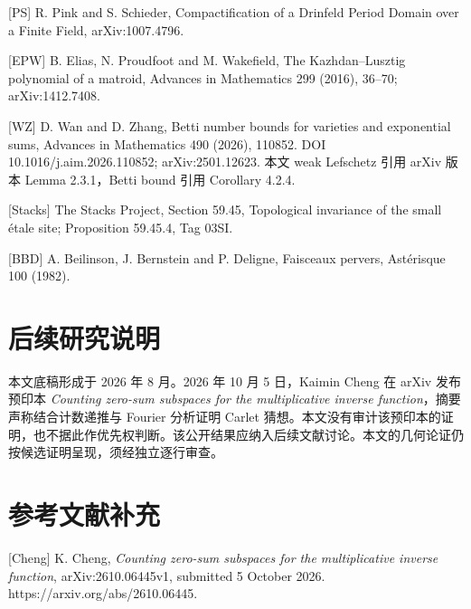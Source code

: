 \documentclass[11pt]{ctexart}
\begin{document}
[PS] R. Pink and S. Schieder, Compactification of a Drinfeld Period Domain over a Finite Field, arXiv:1007.4796.

[EPW] B. Elias, N. Proudfoot and M. Wakefield, The Kazhdan–Lusztig polynomial of a matroid, Advances in Mathematics 299 (2016), 36–70; arXiv:1412.7408.

[WZ] D. Wan and D. Zhang, Betti number bounds for varieties and exponential sums, Advances in Mathematics 490 (2026), 110852. DOI 10.1016/j.aim.2026.110852; arXiv:2501.12623. 本文 weak Lefschetz 引用 arXiv 版本 Lemma 2.3.1，Betti bound 引用 Corollary 4.2.4.

[Stacks] The Stacks Project, Section 59.45, Topological invariance of the small étale site; Proposition 59.45.4, Tag 03SI.

[BBD] A. Beilinson, J. Bernstein and P. Deligne, Faisceaux pervers, Astérisque 100 (1982).

\section{后续研究说明}

本文底稿形成于 2026 年 8 月。2026 年 10 月 5 日，Kaimin Cheng 在 arXiv 发布预印本 \emph{Counting zero-sum subspaces for the multiplicative inverse function}，摘要声称结合计数递推与 Fourier 分析证明 Carlet 猜想。本文没有审计该预印本的证明，也不据此作优先权判断。该公开结果应纳入后续文献讨论。本文的几何论证仍按候选证明呈现，须经独立逐行审查。

\section*{参考文献补充}

[Cheng] K. Cheng, \emph{Counting zero-sum subspaces for the multiplicative inverse function}, arXiv:2610.06445v1, submitted 5 October 2026. https://arxiv.org/abs/2610.06445.
\end{document}
